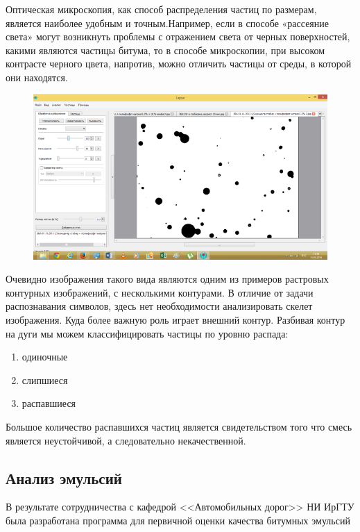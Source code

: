 Оптическая микроскопия, как способ распределения частиц по размерам, является наиболее удобным и точным.Например, если в способе «рассеяние света» могут возникнуть проблемы с отражением света от черных поверхностей, какими являются частицы битума, то в способе микроскопии, при высоком контрасте черного цвета, напротив, можно отличить частицы от среды, в которой они находятся.

\begin{figure}[h]
	\centering
	\includegraphics{images/em_00}
\end{figure}

Очевидно изображения такого вида являются одним из примеров растровых контурных изображений, с несколькими контурами. В отличие от задачи распознавания символов, здесь нет необходимости анализировать скелет изображения. Куда более важную роль играет внешний контур. Разбивая контур на дуги мы можем классифицировать частицы по уровню распада:
\begin{enumerate}
\item одиночные
\item слипшиеся
\item распавшиеся
\end{enumerate}
Большое количество распавшихся частиц является свидетельством того что смесь является неустойчивой, а следовательно некачественной.

\subsection{Анализ эмульсий}
В результате сотрудничества с кафедрой <<Автомобильных дорог>> НИ ИрГТУ была разработана программа для первичной оценки качества битумных эмульсий

